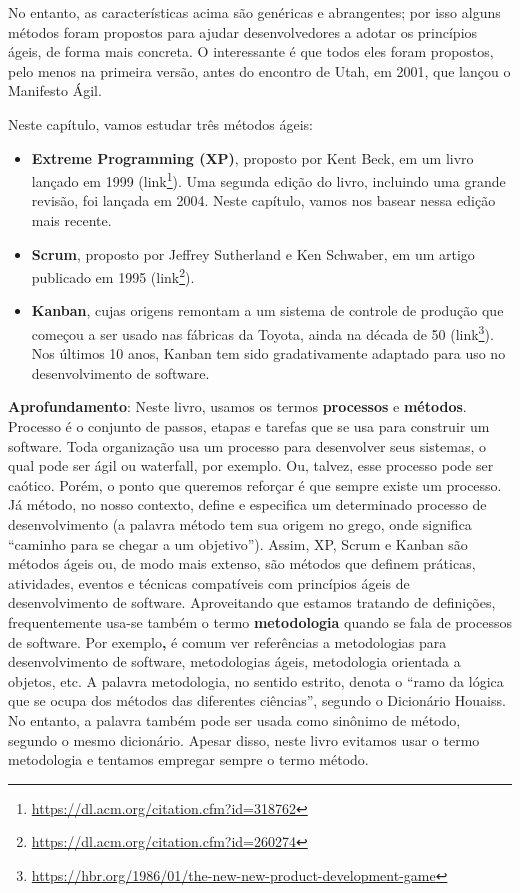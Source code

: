 \documentclass[
  11pt,
  twoside]{book}
\DeclareRobustCommand{\href}[2]{#2\footnote{\url{#1}}}
\newenvironment{esmbox}{\centering \vspace{1.5ex} \begin{tcolorbox}[breakable, colback=backcolor, width=4.9in]}{\end{tcolorbox} \vspace{1.5ex}}
\begin{document}
No entanto, as características acima são genéricas e abrangentes; por
isso alguns métodos foram propostos para ajudar desenvolvedores a adotar
os princípios ágeis, de forma mais concreta. O interessante é que todos
eles foram propostos, pelo menos na primeira versão, antes do encontro
de Utah, em 2001, que lançou o Manifesto Ágil.

Neste capítulo, vamos estudar três métodos ágeis:

\begin{itemize}
\item
  \textbf{Extreme Programming (XP)}, proposto por Kent Beck,
   em um livro lançado em 1999
  (\href{https://dl.acm.org/citation.cfm?id=318762}{link}). Uma segunda
  edição do livro, incluindo uma grande revisão, foi lançada em 2004.
  Neste capítulo, vamos nos basear nessa edição mais recente.
\item
  \textbf{Scrum}, proposto por Jeffrey Sutherland e Ken Schwaber,
    em um artigo
  publicado em 1995
  (\href{https://dl.acm.org/citation.cfm?id=260274}{link}).
\item
  \textbf{Kanban}, cujas origens remontam a um sistema de controle de
  produção que começou a ser usado nas fábricas da Toyota,
   ainda na década de 50
  (\href{https://hbr.org/1986/01/the-new-new-product-development-game}{link}).
  Nos últimos 10 anos, Kanban tem sido gradativamente adaptado para uso
  no desenvolvimento de software.
\end{itemize}

\begin{esmbox}

\textbf{Aprofundamento}: Neste livro, usamos os termos
\textbf{processos} e \textbf{métodos}. Processo é o conjunto de passos,
etapas e tarefas que se usa para construir um software. Toda organização
usa um processo para desenvolver seus sistemas, o qual pode ser ágil ou
waterfall, por exemplo. Ou, talvez, esse processo pode ser caótico.
Porém, o ponto que queremos reforçar é que sempre existe um processo. Já
método, no nosso contexto, define e especifica um determinado processo
de desenvolvimento (a palavra método tem sua origem no grego, onde
significa ``caminho para se chegar a um objetivo''). Assim, XP, Scrum e
Kanban são métodos ágeis ou, de modo mais extenso, são métodos que
definem práticas, atividades, eventos e técnicas compatíveis com
princípios ágeis de desenvolvimento de software. Aproveitando que
estamos tratando de definições, frequentemente usa-se também o termo
\textbf{metodologia} quando se fala de processos de software. Por
exemplo\textbf{,} é comum ver referências a metodologias para
desenvolvimento de software, metodologias ágeis, metodologia orientada a
objetos, etc. A palavra metodologia, no sentido estrito, denota o ``ramo
da lógica que se ocupa dos métodos das diferentes ciências'', segundo o
Dicionário Houaiss. No entanto, a palavra também pode ser usada como
sinônimo de método, segundo o mesmo dicionário. Apesar disso, neste
livro evitamos usar o termo metodologia e tentamos empregar sempre o
termo método.

\end{esmbox}
\end{document}
